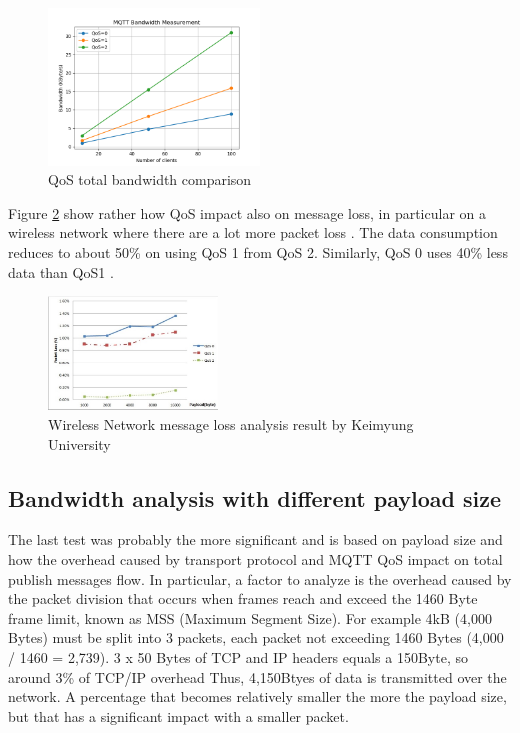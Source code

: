 \documentclass[journal]{IEEEtran}
\begin{document}
\begin{figure}[h]
	\centering
	\includegraphics[width=0.50\textwidth]{qos}
	\caption{QoS total bandwidth comparison}
	\label{fig:qos}
\end{figure}

Figure \ref{fig:loss} show rather how QoS impact also on message loss, in particular on a wireless network where there are a lot more packet loss \cite{qoslevel}. 
The data consumption reduces to about 50\% on using QoS 1 from QoS 2. Similarly, QoS 0 uses 40\% less data than QoS1 \cite{datausage}.

\begin{figure}[h]
	\centering
	\includegraphics[width=0.40\textwidth]{loss}
	\caption{Wireless Network message loss analysis result by Keimyung University \cite{qoslevel}}
	\label{fig:loss}
\end{figure}

\subsection{Bandwidth analysis with different payload size}
The last test was probably the more significant and is based on payload size and how the overhead caused by transport protocol and MQTT QoS impact on total publish messages flow. In particular, a factor to analyze is the overhead caused by the packet division that occurs when frames reach and exceed the 1460 Byte frame limit, known as MSS (Maximum Segment Size). For example 4kB (4,000 Bytes) must be split into 3 packets, each packet not exceeding 1460 Bytes (4,000 / 1460 = 2,739). 
3 x 50 Bytes of TCP and IP headers equals a 150Byte, so around 3\% of TCP/IP overhead
Thus, 4,150Btyes of data is transmitted over the network. 
A percentage that becomes relatively smaller the more the payload size, but that has a significant impact with a smaller packet. 
\end{document}
